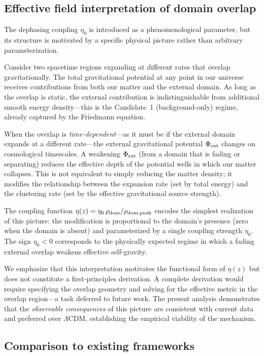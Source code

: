 \documentclass[aps,prd,twocolumn,superscriptaddress,nofootinbib]{revtex4-2}
\begin{document}
\subsection{Effective field interpretation of domain overlap}

The dephasing coupling $\eta_0$ is introduced as a phenomenological
parameter, but its structure is motivated by a specific physical
picture rather than arbitrary parameterization.

Consider two spacetime regions expanding at different rates that
overlap gravitationally. The total gravitational potential at any
point in our universe receives contributions from both our matter
and the external domain. As long as the overlap is static, the
external contribution is indistinguishable from additional smooth
energy density---this is the Candidate~1 (background-only) regime,
already captured by the Friedmann equation.

When the overlap is \emph{time-dependent}---as it must be if the
external domain expands at a different rate---the external
gravitational potential $\Phi_{\rm ext}$ changes on cosmological
timescales. A weakening $\Phi_{\rm ext}$ (from a domain that is
fading or separating) reduces the effective depth of the potential
wells in which our matter collapses. This is not equivalent to
simply reducing the matter density; it modifies the relationship
between the expansion rate (set by total energy) and the
clustering rate (set by the effective gravitational source
strength).

The coupling function $\eta(z) = \eta_0\,\rho_{\rm dom}/
\rho_{\rm dom,peak}$ encodes the simplest realization of this
picture: the modification is proportional to the domain's
presence (zero when the domain is absent) and parameterized by a
single coupling strength $\eta_0$. The sign $\eta_0 < 0$
corresponds to the physically expected regime in which a fading
external overlap weakens effective self-gravity.

We emphasize that this interpretation motivates the functional
form of $\eta(z)$ but does not constitute a first-principles
derivation. A complete derivation would require specifying the
overlap geometry and solving for the effective metric in the
overlap region---a task deferred to future work. The present
analysis demonstrates that the \emph{observable consequences} of
this picture are consistent with current data and preferred over
$\Lambda$CDM, establishing the empirical viability of the
mechanism.


\subsection{Comparison to existing frameworks}
\end{document}
